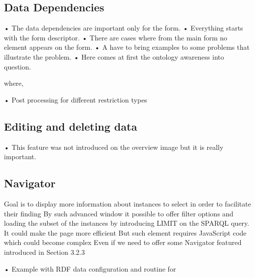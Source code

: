 \subsection{Data Dependencies}


•	The data dependencies are important only for the form. 
•	Everything starts with the form descriptor.
•	There are cases where from the main form no element appears on the form.
•	A have to bring examples to some problems that illustrate the problem.
•	Here comes at first the ontology awareness into question.


where,



•	Post processing for different restriction types


\subsection{Editing and deleting data}

•	This feature was not introduced on the overview image but it is really important.



\subsection{Navigator}


Goal is to display more information about instances to select in order to facilitate their finding
By such advanced window it possible to offer filter options and loading the subset of the instances by introducing LIMIT on the SPARQL query. It could make the page more efficient
But such element requires JavaScript code which could become complex
Even if we need to offer some Navigator featured introduced in Section 3.2.3



•	Example with RDF data configuration and routine for 



